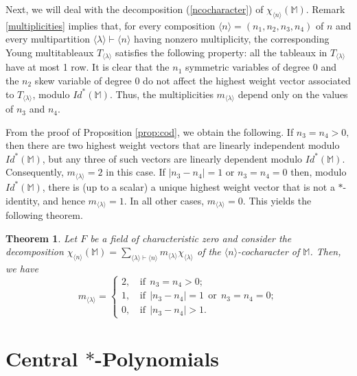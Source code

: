 \documentclass[11pt]{amsart}
\newtheorem{theorem}{Theorem}[section]
\theoremstyle{definition}
\theoremstyle{remark}
\begin{document}
    Next, we will deal with the decomposition (\ref{ncocharacter}) of $\chi_{\langle n\rangle}(\mathbb M)$. Remark \ref{multiplicities} implies that, for every composition $\langle n \rangle=(n_1,n_2,n_3,n_4)$ of $n$ and every multipartition $\langle \lambda\rangle\vdash \langle n \rangle$ having nonzero multiplicity, the corresponding Young multitableaux $T_{\langle \lambda\rangle}$ satisfies the following property: all the tableaux in $T_{\langle \lambda\rangle}$ have at most 1 row. It is clear that the $n_1$ symmetric variables of degree 0 and the $n_2$ skew variable of degree 0 do not affect the highest weight vector associated to $T_{\langle \lambda\rangle}$, modulo $Id^*(\mathbb M).$ Thus, the multiplicities $m_{\langle \lambda\rangle}$ depend only on the values of $n_3$ and $n_4.$ 
    
    From the proof of Proposition \ref{prop:cod}, we obtain the following. If $n_3=n_4>0,$ then there are two highest weight vectors that are linearly independent modulo $Id^*(\mathbb M)$, but any three of such vectors are linearly dependent modulo $Id^*(\mathbb M)$. Consequently, $m_{\langle \lambda\rangle}=2$ in this case. If $|n_3-n_4|=1$ or $n_3=n_4=0$ then, modulo $Id^*(\mathbb M)$, there is (up to a scalar) a unique highest weight vector that is not a $\ast$-identity, and hence $m_{\langle \lambda \rangle}=1$. In all other cases, $m_{\langle \lambda \rangle}=0$. This yields the following theorem.
    

    \begin{theorem}\label{thm:coc}
        Let $F$ be a field of characteristic zero and consider the decomposition $\chi_{\langle n\rangle}(\mathbb M)=\displaystyle \sum_{\langle \lambda \rangle\vdash \langle n\rangle} m_{\langle \lambda \rangle}\chi_{\langle \lambda \rangle}$ of the $\langle n\rangle$-cocharacter of $\mathbb M$. Then, we have  $$ m_{\langle \lambda \rangle}=\begin{cases}
         2, &\, \text{if}\;\,  n_3=n_4>0;\\
         1, & \, \text{if}\;\, |n_3-n_4|=1\;\, \text{or}\;\, n_3=n_4=0;\\
         0, & \, \text{if}\;\,  |n_3-n_4|>1.
        \end{cases}$$
    \end{theorem}
    
    
    
\section{Central $*$-Polynomials}
	
\end{document}
